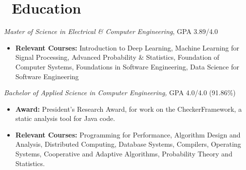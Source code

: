 \documentclass{resume}
\begin{document}
\section{\faGraduationCap\ Education}
 {
  \fontsize{10.5pt}{2}\selectfont
  \textit{Master of Science in Electrical \& Computer Engineering}, GPA 3.89/4.0
  \begin{itemize}
    \item {\textbf{Relevant Courses:} Introduction to Deep Learning, Machine Learning for Signal Processing, Advanced Probability \& Statistics, Foundation of Computer Systems, Foundations in Software Engineering, Data Science for Software Engineering}
  \end{itemize}


  \textit{Bachelor of Applied Science in Computer Engineering,} GPA 4.0/4.0 (91.86\%) \newline
  \begin{itemize}
    \item {\textbf{Award:} President's Research Award, for work on the CheckerFramework, a static analysis tool for Java code.}
    \item {\textbf{Relevant Courses:} Programming for Performance, Algorithm Design and Analysis, Distributed Computing, Database Systems, Compilers, Operating Systems, Cooperative and Adaptive Algorithms, Probability Theory and Statistics.}
  \end{itemize}
  \par
 }



%
%
\end{document}
